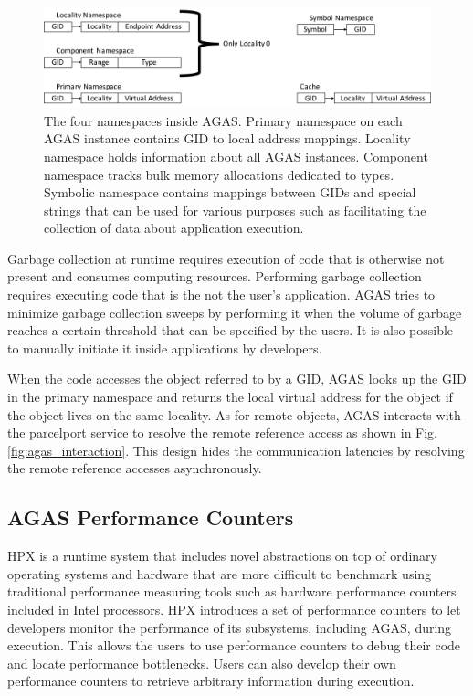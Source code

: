 \begin{figure}[t]
    \centering
    \includegraphics[width=.9\textwidth,height=\textheight,keepaspectratio]{illustrations/agas_intern}
    \caption{The four namespaces inside AGAS. Primary namespace on each AGAS instance contains GID to local address mappings. Locality namespace holds information about all AGAS instances. Component namespace tracks bulk memory allocations dedicated to types. Symbolic namespace contains mappings between GIDs and special strings that can be used for various purposes such as facilitating the collection of data about application execution.}
    \label{fig:agas_intern}
\end{figure}

Garbage collection at runtime requires execution of code that is otherwise not
present and consumes computing resources. Performing garbage collection
requires executing code that is the not the user's application. AGAS tries to
minimize garbage collection sweeps by performing it when the volume of garbage
reaches a certain threshold that can be specified by the users. It is also
possible to manually initiate it inside applications by developers.

When the code accesses the object referred to by a GID, AGAS looks up the GID
in the primary namespace and returns the local virtual address for the object
if the object lives on the same locality. As for remote objects, AGAS interacts
with the parcelport service to resolve the remote reference access as shown in
Fig. \ref{fig:agas_interaction}. This design hides the communication latencies
by resolving the remote reference accesses asynchronously.

\subsection{AGAS Performance Counters}
HPX is a runtime system that includes novel abstractions on top of ordinary
operating systems and hardware that are more difficult to benchmark using traditional
performance measuring tools such as hardware performance counters included in
Intel processors. HPX introduces a set of performance counters to let
developers monitor the performance of its subsystems, including AGAS, during
execution. This allows the users to use performance counters to debug their
code and locate performance bottlenecks. Users can also develop their own
performance counters to retrieve arbitrary information during execution.

